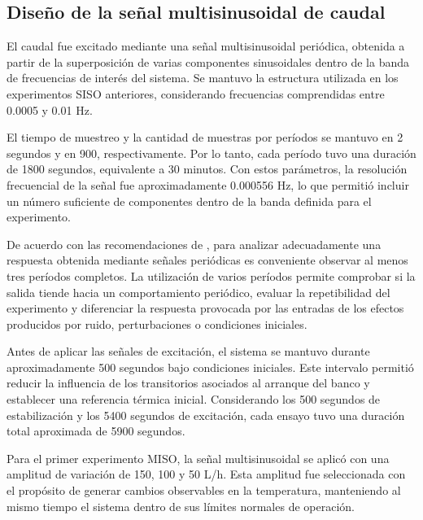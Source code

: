 \documentclass[11pt]{report}
\begin{document}
\subsection{Diseño de la señal multisinusoidal de caudal}

El caudal fue excitado mediante una señal multisinusoidal periódica, obtenida a partir de la superposición de varias componentes sinusoidales dentro de la banda de frecuencias de interés del sistema. Se mantuvo la estructura utilizada en los experimentos SISO anteriores, considerando frecuencias comprendidas entre 0.0005 y 0.01 Hz.

El tiempo de muestreo y la cantidad de muestras por períodos se mantuvo en 2 segundos y en 900, respectivamente. Por lo tanto, cada período tuvo una duración de 1800 segundos, equivalente a 30 minutos. Con estos parámetros, la resolución frecuencial de la señal fue aproximadamente 0.000556 Hz, lo que permitió incluir un número suficiente de componentes dentro de la banda definida para el experimento.

De acuerdo con las recomendaciones de \cite{ljung1999system}, para analizar adecuadamente una respuesta obtenida mediante señales periódicas es conveniente observar al menos tres períodos completos. La utilización de varios períodos permite comprobar si la salida tiende hacia un comportamiento periódico, evaluar la repetibilidad del experimento y diferenciar la respuesta provocada por las entradas de los efectos producidos por ruido, perturbaciones o condiciones iniciales. %

Antes de aplicar las señales de excitación, el sistema se mantuvo durante aproximadamente 500 segundos bajo condiciones iniciales. Este intervalo permitió reducir la influencia de los transitorios asociados al arranque del banco y establecer una referencia térmica inicial. Considerando los 500 segundos de estabilización y los 5400 segundos de excitación, cada ensayo tuvo una duración total aproximada de 5900 segundos.

Para el primer experimento MISO, la señal multisinusoidal se aplicó con una amplitud de variación de 150, 100 y 50 L/h. Esta amplitud fue seleccionada con el propósito de generar cambios observables en la temperatura, manteniendo al mismo tiempo el sistema dentro de sus límites normales de operación.
\end{document}
